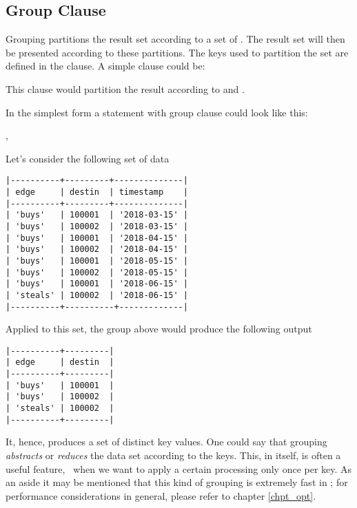 \subsection{Group Clause}\label{sec_group}
Grouping partitions the result set
according to a set of .
The result set will then be presented
according to these partitions.
The keys used to partition the set
are defined in the  clause.
A simple  clause could be:

 

This clause would partition the result
according to  and .

In the simplest form a statement with
group clause could look like this:

 ,
 
 

Let's consider the following set of data

\begin{minipage}{\textwidth}
\begin{verbatim}
|----------+---------+--------------|
| edge     | destin  | timestamp    |
|----------+---------+--------------|
| 'buys'   | 100001  | '2018-03-15' |
| 'buys'   | 100002  | '2018-03-15' |
| 'buys'   | 100001  | '2018-04-15' |
| 'buys'   | 100002  | '2018-04-15' |
| 'buys'   | 100001  | '2018-05-15' |
| 'buys'   | 100002  | '2018-05-15' |
| 'buys'   | 100001  | '2018-06-15' |
| 'steals' | 100002  | '2018-06-15' |
|----------+----------+-------------|
\end{verbatim}
\end{minipage}

Applied to this set,
the group above would produce the following output

\begin{minipage}{\textwidth}
\begin{verbatim}
|----------+---------|
| edge     | destin  |
|----------+---------|
| 'buys'   | 100001  |
| 'buys'   | 100002  |
| 'steals' | 100002  |
|----------+---------|
\end{verbatim}
\end{minipage}

It, hence, produces a set of distinct key values.
One could say that grouping \emph{abstracts} or \emph{reduces}
the data set according to the keys.
This, in itself, is often a useful feature,
\viz\ when we want to apply a certain processing
only once per key. As an aside it may be mentioned
that this kind of grouping is extremely fast in \nowdb;
for performance considerations in general, please
refer to chapter \ref{chpt_opt}.

